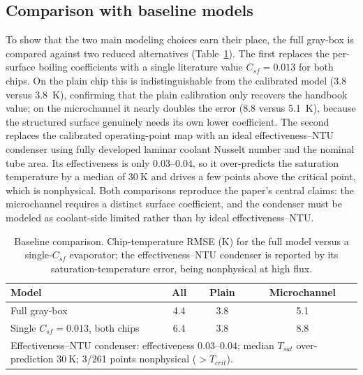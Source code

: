 \documentclass[11pt]{article}
\begin{document}
\subsection{Comparison with baseline models}
\label{sec:baseline}
To show that the two main modeling choices earn their place, the full gray-box is compared against
two reduced alternatives (Table~\ref{tab:baseline}). The first replaces the per-surface boiling
coefficients with a single literature value $C_{sf}=0.013$ for both chips. On the plain chip this
is indistinguishable from the calibrated model (3.8 versus 3.8~K), confirming that the plain
calibration only recovers the handbook value; on the microchannel it nearly doubles the error
(8.8 versus 5.1~K), because the structured surface genuinely needs its own lower coefficient. The
second replaces the calibrated operating-point map with an ideal effectiveness--NTU condenser using
fully developed laminar coolant Nusselt number and the nominal tube area. Its effectiveness is only
$0.03$--$0.04$, so it over-predicts the saturation temperature by a median of $30~\mathrm{K}$ and
drives a few points above the critical point, which is nonphysical. Both comparisons reproduce the
paper's central claims: the microchannel requires a distinct surface coefficient, and the condenser
must be modeled as coolant-side limited rather than by ideal effectiveness--NTU.

\begin{table}[H]
\centering
\caption{Baseline comparison. Chip-temperature RMSE (K) for the full model versus a single-$C_{sf}$
evaporator; the effectiveness--NTU condenser is reported by its saturation-temperature error,
being nonphysical at high flux.}
\label{tab:baseline}
\begin{tabular}{lccc}
\toprule
Model & All & Plain & Microchannel\\
\midrule
Full gray-box & 4.4 & 3.8 & 5.1\\
Single $C_{sf}=0.013$, both chips & 6.4 & 3.8 & 8.8\\
\midrule
\multicolumn{4}{p{0.86\columnwidth}}{\footnotesize Effectiveness--NTU condenser: effectiveness
$0.03$--$0.04$; median $T_{sat}$ over-prediction $30~\mathrm{K}$; 3/261 points nonphysical
($>T_{crit}$).}\\
\bottomrule
\end{tabular}
\end{table}
\end{document}

